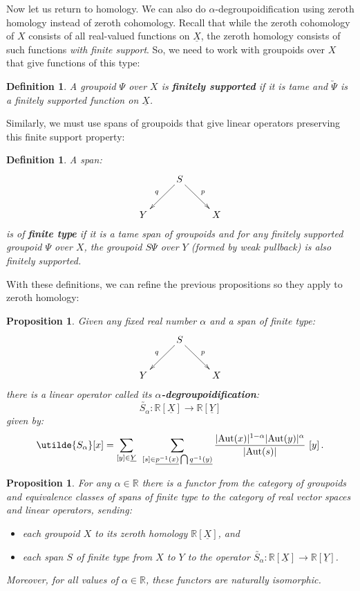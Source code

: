 \documentclass{article}
\renewcommand{\to}{\rightarrow}
\newcommand{\maps}{\colon}
\newcommand{\R}{{\mathbb R}}
\newcommand{\Aut}{{\rm Aut}}
\renewcommand{\u}[1]{\underline{#1}}
\newtheorem{definition}[thm]{Definition}
\newtheorem{proposition}[thm]{Proposition}
\begin{document}
Now let us return to homology.  We can also do
$\alpha$-degroupoidification using zeroth homology instead of zeroth
cohomology.  Recall that while the zeroth cohomology of $X$ consists
of all real-valued functions on $\u{X}$, the zeroth homology consists
of such functions \textit{with finite support}.  So, we need to work
with groupoids over $X$ that give functions of this type:

\begin{definition} A groupoid $\Psi$ over $X$ is {\bf finitely supported} 
if it is tame and $\utilde{\Psi}$ is a finitely supported function on 
$\u{X}$.
\end{definition}

\noindent
Similarly, we must use spans of groupoids that give linear operators
preserving this finite support property:

\begin{definition}\label{finitetypespan}
A span:
\[\xymatrix{
& S \ar[dl]_{q} \ar[dr]^{p}& \\
Y & & X
}\]
is of {\bf finite type} if it is a tame span of groupoids and for any
finitely supported groupoid $\Psi$ over $X$, the groupoid $S\Psi$ over
$Y$ (formed by weak pullback) is also finitely supported.
\end{definition}

With these definitions, we can refine the previous propositions so
they apply to zeroth homology:

\begin{proposition}
\label{homological_alpha_degroupoidification}
Given any fixed real number $\alpha$ and a span of finite type:
\[\xymatrix{
 & S\ar[dl]_q\ar[dr]^p & \\
 Y & & X \\
}\]
there is a linear operator called its {\bf \boldmath
$\alpha$-degroupoidification}:
\[ \utilde{S_\alpha}\maps \R[\u{X}] \to \R[\u{Y}]  \]
given by:
\[   
\utilde{S_\alpha} [x] =
\sum_{[y] \in \u{Y}} \;\,
\sum_{[s]\in\u{p^{-1}(x)}\bigcap \u{q^{-1}(y)}}
\frac{|\Aut(x)|^{1-\alpha}|\Aut(y)|^\alpha}{|\Aut(s)|} \,\, [y]   \, .
\]
\end{proposition}

\begin{proposition}\label{alphaspancomposefinite}
For any $\alpha \in \R$ there is a functor from the category of
groupoids and equivalence classes of spans of finite type to the
category of real vector spaces and linear operators, sending:
\begin{itemize}
\item
each groupoid $X$ to its zeroth homology $\R[\u{X}]$, and
\item 
each span $S$ of finite type from $X$ to $Y$ to the operator
$\utilde{S_\alpha}\maps \R[\u{X}] \to \R[\u{Y}]$.
\end{itemize}
Moreover, for all values of $\alpha \in \R$, these functors are
naturally isomorphic.
\end{proposition}
\end{document}
